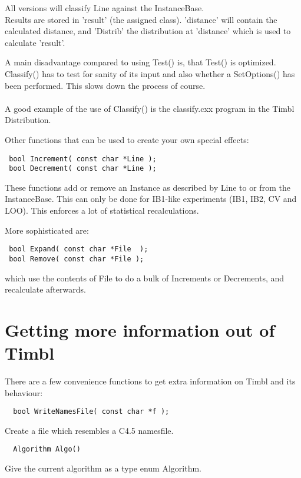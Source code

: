 \documentclass{article}
\begin{document}
All versions will classify Line against the InstanceBase.\\
Results are stored in 'result' (the assigned class). 'distance' will
contain the calculated distance, and 'Distrib' the distribution at
'distance' which is used to calculate 'result'.

A main disadvantage compared to using Test() is, that Test() is optimized.
Classify() has to test for sanity of its input and also whether a
SetOptions() has been performed. This slows down the process of
course. \\
\ \\
A good example of the use of Classify() is the classify.cxx program in
the Timbl Distribution.

Other functions that can be used to create your own special effects:

\begin{verbatim}
 bool Increment( const char *Line ); 
 bool Decrement( const char *Line ); 
\end{verbatim}

These functions add or remove an Instance as described by Line to or
from the InstanceBase.
This can only be done for IB1-like experiments (IB1, IB2, CV and LOO).
This enforces a lot of statistical recalculations.

More sophisticated are:
\begin{verbatim}
 bool Expand( const char *File  );
 bool Remove( const char *File );
\end{verbatim}

which use the contents of File to do a bulk of Increments or Decrements, and
recalculate afterwards.

\section{Getting more information out of Timbl}

There are a few convenience functions to get extra information on
Timbl and its behaviour:

\begin{verbatim}
  bool WriteNamesFile( const char *f );
\end{verbatim}

Create a file which resembles a C4.5 namesfile.

\begin{verbatim}
  Algorithm Algo()
\end{verbatim}

Give the current algorithm as a type enum Algorithm.
\end{document}
